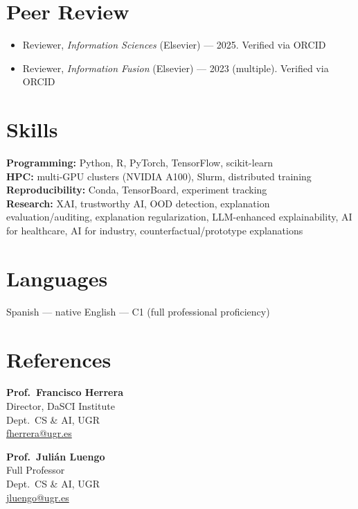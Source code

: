 \documentclass[11pt,a4paper]{article}
\newcommand{\subt}[1]{{\color{subtitle}\small #1}\par}
\begin{document}
\section*{Peer Review}

\begin{itemize}
  \item Reviewer, \textit{Information Sciences} (Elsevier) --- 2025. \subt{Verified via ORCID}
  \item Reviewer, \textit{Information Fusion} (Elsevier) --- 2023 (multiple). \subt{Verified via ORCID}
\end{itemize}

\section*{Skills}

\textbf{Programming:} Python, R, PyTorch, TensorFlow, scikit-learn \\
\textbf{HPC:} multi-GPU clusters (NVIDIA A100), Slurm, distributed training \\
\textbf{Reproducibility:} Conda, TensorBoard, experiment tracking \\
\textbf{Research:} XAI, trustworthy AI, OOD detection, explanation evaluation/auditing, explanation regularization, LLM-enhanced explainability, AI for healthcare, AI for industry, counterfactual/prototype explanations

\section*{Languages}

Spanish --- native \quad\textbar\quad English --- C1 (full professional proficiency)

\section*{References}

\begin{minipage}[t]{0.48\textwidth}
  \textbf{Prof.~Francisco Herrera} \\
  Director, DaSCI Institute \\
  Dept.~CS \& AI, UGR \\
  \href{mailto:fherrera@ugr.es}{fherrera@ugr.es}
\end{minipage}\hfill
\begin{minipage}[t]{0.48\textwidth}
  \textbf{Prof.~Julián Luengo} \\
  Full Professor \\
  Dept.~CS \& AI, UGR \\
  \href{mailto:jluengo@ugr.es}{jluengo@ugr.es}
\end{minipage}
\end{document}
